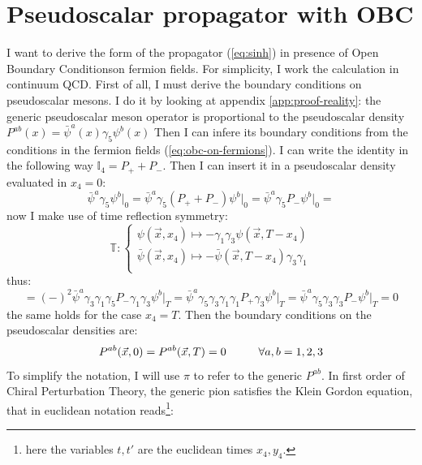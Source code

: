 \documentclass[english, LaM, oneside, noexaminfo]{sapthesis}
\newcommand{\obc}{Open Boundary Conditions}
\begin{document}
\section{Pseudoscalar propagator with OBC}\label{app:sinh-proof}
\noindent
I want to derive the form of the propagator (\ref{eq:sinh}) in presence of \obc\space on fermion fields.
For simplicity, I work the calculation in continuum QCD.
First of all, I must derive the boundary conditions on pseudoscalar mesons.
I do it by looking at appendix \ref{app:proof-reality}: the generic pseudoscalar meson operator is proportional to the pseudoscalar density $P^{ab}(x)=\bar \psi^a (x) \gamma_5 \psi^b (x)$
Then I can infere its boundary conditions from the conditions in the fermion fields (\ref{eq:obc-on-fermions}).
\newline
I can write the identity in the following way $\mathbb{I}_4 = P_+ + P_-$.
Then I can insert it in a pseudoscalar density evaluated in $x_4 = 0$:
\begin{equation*}
    \bar\psi^a \gamma_5 \psi^b \Big|_0 = \bar\psi^a \gamma_5 (P_+ + P_-) \psi^b \Big|_0 = \bar\psi^a \gamma_5 P_- \psi^b \Big|_0 =
\end{equation*}
now I make use of time reflection symmetry:
\begin{equation*}
    \mathbb{T}: 
    \begin{cases}
        \psi (\vec x, x_4) \mapsto - \gamma_1 \gamma_3 \psi (\vec x,T-x_4) \\
        \bar \psi (\vec x, x_4) \mapsto - \bar\psi (\vec x,T-x_4) \gamma_3 \gamma_1 \\
    \end{cases}
\end{equation*}
thus:
\begin{equation*}
    = (-)^2 \bar\psi^a \gamma_3 \gamma_1 \gamma_5 P_- \gamma_1 \gamma_3 \psi^b \Big|_T = \bar\psi^a \gamma_5 \gamma_3 \gamma_1 \gamma_1 P_+ \gamma_3 \psi^b \Big|_T = \bar\psi^a \gamma_5 \gamma_3 \gamma_3 P_- \psi^b \Big|_T = 0
\end{equation*}
the same holds for the case $x_4 = T$. Then the boundary conditions on the pseudoscalar densities are:
\begin{equation}\label{obc-on-pions}
    P^{ab} (\vec x , 0) = P^{ab} (\vec x , T) = 0 \hspace*{1cm} \forall a,b = 1,2,3
\end{equation}
To simplify the notation, I will use $\pi$ to refer to the generic $P^{ab}$.
\newline
In first order of Chiral Perturbation Theory, the generic pion satisfies the Klein Gordon equation, that in euclidean notation reads\footnote{here the variables $t,t'$ are the euclidean times $x_4, y_4$.}:
\end{document}
